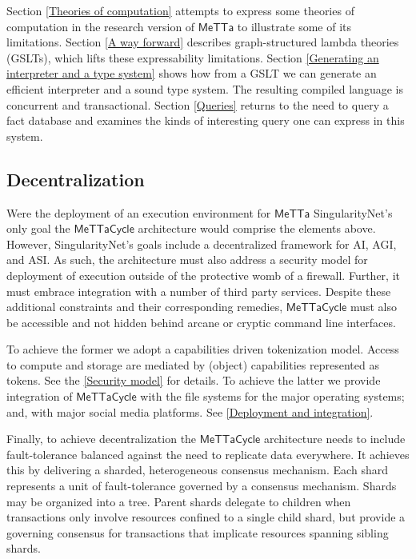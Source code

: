 \documentclass{article}
\newcommand{\MC}{\mathsf{MeTTaCycle}}
\begin{document}
Section \ref{Theories of computation} attempts to express some
theories of computation in the research version of $\mathsf{MeTTa}$ to
illustrate some of its limitations.  Section \ref{A way forward}
describes graph-structured lambda theories (GSLTs), which lifts these
expressability limitations.  Section \ref{Generating an interpreter
  and a type system} shows how from a GSLT we can generate an
efficient interpreter and a sound type system.  The resulting compiled
language is concurrent and transactional. Section \ref{Queries}
returns to the need to query a fact database and examines the kinds of
interesting query one can express in this system.

\subsection{Decentralization}

Were the deployment of an execution environment for $\mathsf{MeTTa}$
SingularityNet's only goal the $\MC$ architecture would comprise the
elements above. However, SingularityNet's goals include a
decentralized framework for AI, AGI, and ASI. As such, the
architecture must also address a security model for deployment of
execution outside of the protective womb of a firewall. Further, it
must embrace integration with a number of third party
services. Despite these additional constraints and their corresponding
remedies, $\MC$ must also be accessible and not hidden behind arcane
or cryptic command line interfaces.

To achieve the former we adopt a capabilities driven tokenization
model. Access to compute and storage are mediated by (object)
capabilities represented as tokens. See the \ref{Security model} for
details. To achieve the latter we provide integration of $\MC$ with
the file systems for the major operating systems; and, with major
social media platforms. See \ref{Deployment and integration}.

Finally, to achieve decentralization the $\MC$ architecture needs to
include fault-tolerance balanced against the need to replicate data
everywhere. It achieves this by delivering a sharded, heterogeneous
consensus mechanism. Each shard represents a unit of fault-tolerance
governed by a consensus mechanism. Shards may be organized into a
tree. Parent shards delegate to children when transactions only
involve resources confined to a single child shard, but provide a
governing consensus for transactions that implicate resources spanning
sibling shards.
\end{document}
